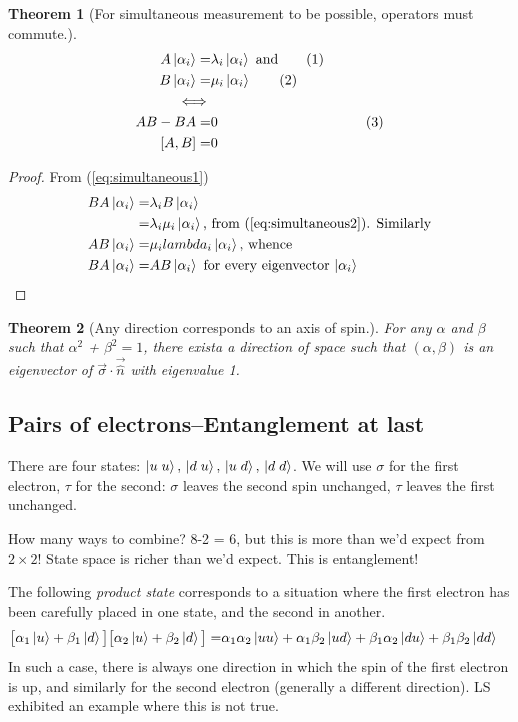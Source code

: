 \documentclass[]{article}
\newcommand\numberthis{\addtocounter{equation}{1}\tag{\theequation}}
\newtheorem{thm}{Theorem}
\begin{document}
\begin{thm}[For simultaneous measurement to be possible, operators must commute.]
	\begin{align*}
			A\ket{\alpha_i} =& \lambda_i \ket{\alpha_i} \text{ and} \numberthis \label{eq:simultaneous1}\\
			B\ket{\alpha_i} =& \mu_i \ket{\alpha_i} \numberthis\label{eq:simultaneous2}\\
			\iff &\\
			AB - BA =& 0& \numberthis \label{eq:simultaneous3}\\
			[A,B] =& 0
	\end{align*}
\end{thm}

\begin{proof}
	From (\ref{eq:simultaneous1})
	\begin{align*}
		B A\ket{\alpha_i} =& \lambda_i B \ket{\alpha_i}\\
		=& \lambda_i \mu_i \ket{\alpha_i} \text{, from (\ref{eq:simultaneous2})} \text{. Similarly}\\
		A  B \ket{\alpha_i} =& \mu_i  lambda_i \ket{\alpha_i} \text{, whence}\\
		B A\ket{\alpha_i} =& A  B \ket{\alpha_i} \text{ for every eigenvector $\ket{\alpha_i}$}
	\end{align*}
\end{proof}
\begin{thm}[Any direction corresponds to an axis of spin.]
	For any $\alpha$ and $\beta$ such that $\alpha^2$ + $\beta^2=1$, there exista a direction of space such that $(\alpha, \beta)$ is an eigenvector of $\vec{\sigma} \cdot\vec{\hat{n}}$ with eigenvalue 1.
\end{thm}

\subsection{Pairs of electrons--Entanglement at last}
There are four states: $\ket{u\;u}, \,\ket{d\;u}, \,\ket{u\;d}, \,\ket{d\;d}$.  We will use $\sigma$ for the first electron, $\tau$ for the second:  $\sigma$ leaves the second spin unchanged, $\tau$ leaves the first unchanged.

How many ways to combine? 8-2 = 6, but this is more than we'd expect from $2\times2$! State space is richer than we'd expect. This is entanglement!

The following \emph{product state} corresponds to a situation where the first electron has been carefully placed in one state, and the second in another.
\begin{align*}
	\big[\alpha_1\ket{u} + \beta_1\ket{d}\big]\big[\alpha_2\ket{u} + \beta_2\ket{d}\big] =& \alpha_1 \alpha_2 \ket{uu} + \alpha_1 \beta_2 \ket{ud} + \beta_1 \alpha_2 \ket{du} + \beta_1 \beta_2 \ket{dd}
\end{align*}
In such a case, there is always one direction in which the spin of the first electron is up, and similarly for the second electron (generally a different direction). LS exhibited an example where this is not true.
\end{document}
